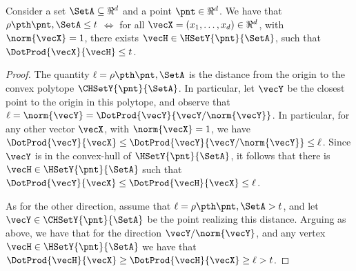 \begin{lemma}%
    Consider a set $\SetA \subseteq \Re^d$ and a point
    $\pnt \in \Re^d$.  We have that $\distTY{\pnt}{\SetA} \leq t$
    $\iff$ for all $\vecX = (x_1, \ldots, x_d) \in \Re^d$, with
    $\norm{\vecX} =1$, there exists
    $\vecH \in \HSetY{\pnt}{\SetA}$,
    such that $\DotProd{\vecX}{\vecH}\leq t$.
\end{lemma}
\begin{proof}
    The quantity $\ell = \distTY{\pnt}{\SetA}$ is the distance from
    the origin to the convex polytope $\CHSetY{\pnt}{\SetA}$. In
    particular, let $\vecY$ be the closest point to the origin in this
    polytope, and observe that
    $\ell = \norm{\vecY} = \DotProd{\vecY}{\vecY/\norm{\vecY}}$. In
    particular, for any other vector $\vecX$, with $\norm{\vecX} =1$,
    we have
    $\DotProd{\vecY}{\vecX} \leq \DotProd{\vecY}{\vecY/\norm{\vecY}}
    \leq \ell$. Since $\vecY$ is in the convex-hull of
    $\HSetY{\pnt}{\SetA}$, it follows that there is
    $\vecH \in \HSetY{\pnt}{\SetA}$ such that
    $\DotProd{\vecY}{\vecX} \leq \DotProd{\vecH}{\vecX}\leq \ell$.

    As for the other direction, assume that
    $\ell = \distTY{\pnt}{\SetA} > t$, and let
    $\vecY \in \CHSetY{\pnt}{\SetA}$ be the point realizing this
    distance. Arguing as above, we have that for the direction
    $\vecY /\norm{\vecY}$, and any vertex
    $\vecH \in \HSetY{\pnt}{\SetA}$ we have that
    $\DotProd{\vecH}{\vecX} \geq \DotProd{\vecH}{\vecX}\geq \ell > t$.
\end{proof}


